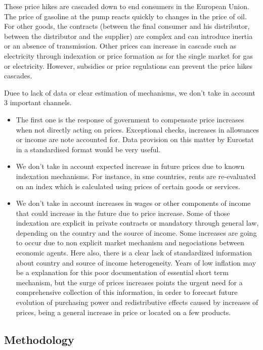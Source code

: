 \documentclass[
  9pt,
  a4paper,
  numbers=noendperiod,
  DIV=12]{scrartcl}
\begin{document}
These price hikes are cascaded down to end consumers in the European
Union. The price of gasoline at the pump reacts quickly to changes in
the price of oil. For other goods, the contracts (between the final
consumer and his distributor, between the distributor and the supplier)
are complex and can introduce inertia or an absence of transmission.
Other prices can increase in cascade such as electricity through
indexation or price formation as for the single market for gas or
electricity. However, subsidies or price regulations can prevent the
price hikes cascades.

Duee to lack of data or clear estimation of mechanisms, we don't take in
account 3 important channels.

\begin{itemize}
\item
  The first one is the response of government to compensate price
  increases when not directly acting on prices. Exceptional checks,
  increases in allowances or income are note accounted for. Data
  provision on this matter by Eurostat in a standardised format would be
  very useful.
\item
  We don't take in account expected increase in future prices due to
  known indexation mechanisms. For instance, in sme countries, rents are
  re-evaluated on an index which is calculated using prices of certain
  goods or services.
\item
  We don't take in account increases in wages or other components of
  income that could increase in the future due to price increase. Some
  of those indexation are explicit in private contracts or mandatory
  through general law, depending on the country and the source of
  income. Some increases are going to occur due to non explicit market
  mechanism and negociations between economic agents. Here also, there
  is a clear lack of standardized information about country and source
  of income heterogeneity. Years of low inflation may be a explanation
  for this poor documentation of essential short term mechanism, but the
  surge of prices increases points the urgent need for a comprehensive
  collection of this information, in order to forecast future evolution
  of purchasing power and redistributive effects caused by increases of
  prices, being a general increase in price or located on a few
  products.
\end{itemize}

\hypertarget{methodology}{%
\subsection{Methodology}\label{methodology}}
\end{document}
